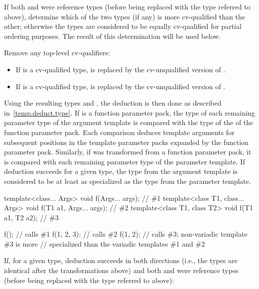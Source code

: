 \pnum
If both
and
were reference types (before being replaced with the type referred to
above), determine which of the two types (if any) is more cv-qualified
than the other; otherwise the types are considered to be equally
cv-qualified for partial ordering purposes. The result of this
determination will be used below.

\pnum
Remove any top-level cv-qualifiers:
\begin{itemize}
\item
If
is a cv-qualified type,
is replaced by the cv-unqualified version of
.
\item
If
is a cv-qualified type,
is replaced by the cv-unqualified version of
.
\end{itemize}

\pnum
Using the resulting types
and
,
the deduction is then done as described in~\ref{temp.deduct.type}.
If  is a function parameter pack, the type  of each remaining
parameter type of the argument template is compared with the type  of
the  of the function parameter pack. Each comparison
deduces template arguments for subsequent positions in the template parameter
packs expanded by the function parameter pack.
Similarly, if  was transformed from a function parameter pack,
it is compared with each remaining parameter type of the parameter template.
If deduction succeeds for a given type,
the type from the argument template is considered to be at least as specialized
as the type from the parameter template.
\begin{example}
\begin{codeblock}
template<class... Args>           void f(Args... args);           // \#1
template<class T1, class... Args> void f(T1 a1, Args... args);    // \#2
template<class T1, class T2>      void f(T1 a1, T2 a2);           // \#3

f();                  // calls \#1
f(1, 2, 3);           // calls \#2
f(1, 2);              // calls \#3; non-variadic template \#3 is more
                      // specialized than the variadic templates \#1 and \#2
\end{codeblock}
\end{example}

\pnum
If, for a given type, deduction succeeds in both directions (i.e., the
types are identical after the transformations above)
and both  and  were reference types (before being replaced with the
type referred to above):

